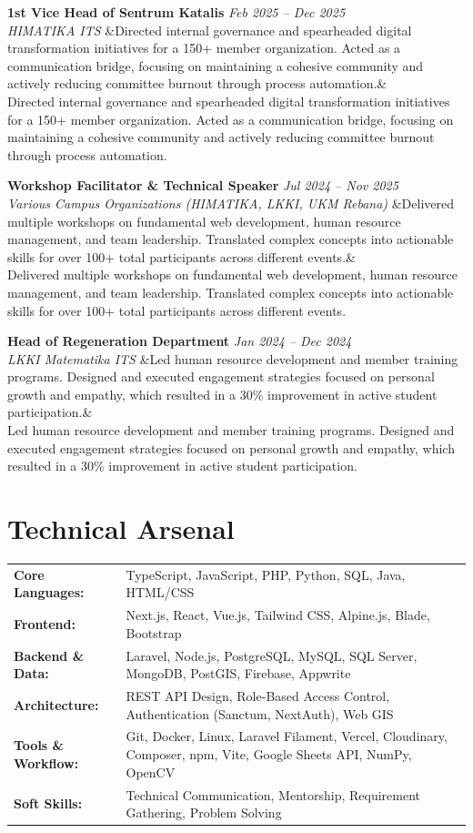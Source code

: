 \documentclass[a4paper,11pt]{article}
\newcommand{\cventry}[4]{%
  \noindent\textbf{#1} \hfill \textit{#3} \\
  \textit{#2}
  \ifx&#4& \else \\ \small #4 \fi
  \vspace{6pt}
}
\begin{document}
\cventry
  {1st Vice Head of Sentrum Katalis}
  {HIMATIKA ITS}
  {Feb 2025 -- Dec 2025}
  {Directed internal governance and spearheaded digital transformation initiatives for a 150+ member organization. Acted as a communication bridge, focusing on maintaining a cohesive community and actively reducing committee burnout through process automation.}

\cventry
  {Workshop Facilitator \& Technical Speaker}
  {Various Campus Organizations (HIMATIKA, LKKI, UKM Rebana)}
  {Jul 2024 -- Nov 2025}
  {Delivered multiple workshops on fundamental web development, human resource management, and team leadership. Translated complex concepts into actionable skills for over 100+ total participants across different events.}

\cventry
  {Head of Regeneration Department}
  {LKKI Matematika ITS}
  {Jan 2024 -- Dec 2024}
  {Led human resource development and member training programs. Designed and executed engagement strategies focused on personal growth and empathy, which resulted in a 30\% improvement in active student participation.}

\section{Technical Arsenal}
\begin{tabularx}{\textwidth}{@{}l X@{}}
\textbf{Core Languages:} & TypeScript, JavaScript, PHP, Python, SQL, Java, HTML/CSS \\[3pt]
\textbf{Frontend:} & Next.js, React, Vue.js, Tailwind CSS, Alpine.js, Blade, Bootstrap \\[3pt]
\textbf{Backend \& Data:} & Laravel, Node.js, PostgreSQL, MySQL, SQL Server, MongoDB, PostGIS, Firebase, Appwrite \\[3pt]
\textbf{Architecture:} & REST API Design, Role-Based Access Control, Authentication (Sanctum, NextAuth), Web GIS \\[3pt]
\textbf{Tools \& Workflow:} & Git, Docker, Linux, Laravel Filament, Vercel, Cloudinary, Composer, npm, Vite, Google Sheets API, NumPy, OpenCV \\[3pt]
\textbf{Soft Skills:} & Technical Communication, Mentorship, Requirement Gathering, Problem Solving \\
\end{tabularx}
\end{document}
